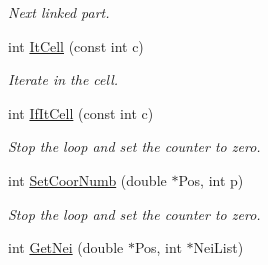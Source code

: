 \begin{DoxyCompactItemize}
\begin{DoxyCompactList}\small\item\em Next linked part. \end{DoxyCompactList}\item 
int \hyperlink{classDdDoubleLoop_af415aae03ca33a44460cc0a84bda0f6d}{It\+Cell} (const int c)\hypertarget{classDdDoubleLoop_af415aae03ca33a44460cc0a84bda0f6d}{}\label{classDdDoubleLoop_af415aae03ca33a44460cc0a84bda0f6d}

\begin{DoxyCompactList}\small\item\em Iterate in the cell. \end{DoxyCompactList}\item 
int \hyperlink{classDdDoubleLoop_a7389c3097a5406135ae60ac38ad141f5}{If\+It\+Cell} (const int c)
\begin{DoxyCompactList}\small\item\em Stop the loop and set the counter to zero. \end{DoxyCompactList}\item 
int \hyperlink{classDdDoubleLoop_ab8ed71a5fc65abc128da0367f93803c1}{Set\+Coor\+Numb} (double $\ast$Pos, int p)
\begin{DoxyCompactList}\small\item\em Stop the loop and set the counter to zero. \end{DoxyCompactList}\item 
int \hyperlink{classDdDoubleLoop_afe0e4e9746cdae570f8c1efdfd04ac16}{Get\+Nei} (double $\ast$Pos, int $\ast$Nei\+List)\hypertarget{classDdDoubleLoop_afe0e4e9746cdae570f8c1efdfd04ac16}{}\label{classDdDoubleLoop_afe0e4e9746cdae570f8c1efdfd04ac16}


\end{DoxyCompactItemize}
